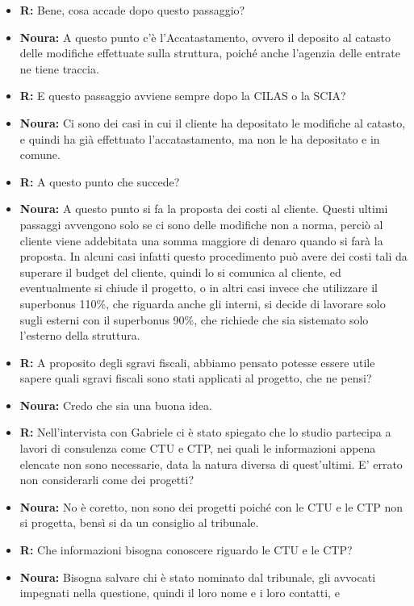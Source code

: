 \documentclass{elegantbook}
\begin{document}
\begin{itemize}
		\item \textbf{R:} Bene, cosa accade dopo questo passaggio?
		\item \textbf{Noura:} A questo punto c'è l'Accatastamento, ovvero il deposito al catasto delle modifiche effettuate sulla struttura, poiché anche l'agenzia
                    delle entrate ne tiene traccia.
		\item \textbf{R:} E questo passaggio avviene sempre dopo la CILAS o la SCIA?
		\item \textbf{Noura:} Ci sono dei casi in cui il cliente ha depositato le modifiche al catasto, e quindi ha già effettuato l'accatastamento, ma non le ha
                    depositato e in comune.
		\item \textbf{R:} A questo punto che succede?
		\item \textbf{Noura:} A questo punto si fa la proposta dei costi al cliente. Questi ultimi passaggi avvengono solo se ci sono delle modifiche non a norma,
                    perciò al cliente viene addebitata una somma maggiore di denaro quando si farà la proposta. In alcuni casi infatti questo procedimento può avere dei costi
                    tali da superare il budget del cliente, quindi lo si comunica al cliente, ed eventualmente si chiude il progetto, o in altri casi invece che utilizzare il
                    superbonus 110\%, che riguarda anche gli interni, si decide di lavorare solo sugli esterni con il superbonus 90\%, che richiede che sia sistemato solo
                    l'esterno della struttura.
		\item \textbf{R:} A proposito degli sgravi fiscali, abbiamo pensato potesse essere utile sapere quali sgravi fiscali sono stati applicati al progetto, che
                    ne pensi?
		\item \textbf{Noura:} Credo che sia una buona idea.
		\item \textbf{R:} Nell'intervista con Gabriele ci è stato spiegato che lo studio partecipa a lavori di consulenza come CTU e CTP, nei quali le informazioni
                    appena elencate non sono necessarie, data la natura diversa di quest'ultimi. E' errato non considerarli come dei progetti?
		\item \textbf{Noura:} No è coretto, non sono dei progetti poiché con le CTU e le CTP non si progetta, bensì si da un consiglio al tribunale.
		\item \textbf{R:} Che informazioni bisogna conoscere riguardo le CTU e le CTP?
		\item \textbf{Noura:} Bisogna salvare chi è stato nominato dal tribunale, gli avvocati impegnati nella questione, quindi il loro nome e i loro contatti, e

\end{itemize}
\end{document}
